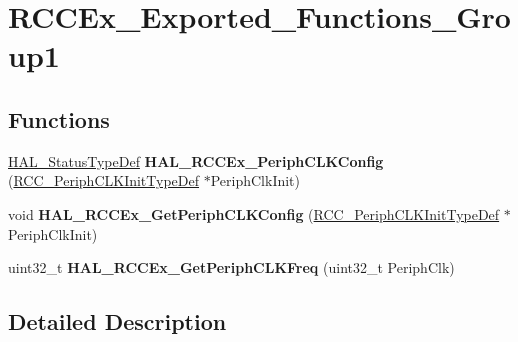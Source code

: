 \hypertarget{group___r_c_c_ex___exported___functions___group1}{}\section{R\+C\+C\+Ex\+\_\+\+Exported\+\_\+\+Functions\+\_\+\+Group1}
\label{group___r_c_c_ex___exported___functions___group1}
\subsection*{Functions}
\begin{DoxyCompactItemize}
\item 
\mbox{\label{group___r_c_c_ex___exported___functions___group1_ga0c0f61a1e2f47cc81bc43d83ba3e0d95}} 
\hyperlink{stm32f1xx__hal__def_8h_a63c0679d1cb8b8c684fbb0632743478f}{H\+A\+L\+\_\+\+Status\+Type\+Def} {\bfseries H\+A\+L\+\_\+\+R\+C\+C\+Ex\+\_\+\+Periph\+C\+L\+K\+Config} (\hyperlink{struct_r_c_c___periph_c_l_k_init_type_def}{R\+C\+C\+\_\+\+Periph\+C\+L\+K\+Init\+Type\+Def} $\ast$Periph\+Clk\+Init)
\item 
\mbox{\label{group___r_c_c_ex___exported___functions___group1_ga754fc5136c63ad52b7c459aafc8a3927}} 
void {\bfseries H\+A\+L\+\_\+\+R\+C\+C\+Ex\+\_\+\+Get\+Periph\+C\+L\+K\+Config} (\hyperlink{struct_r_c_c___periph_c_l_k_init_type_def}{R\+C\+C\+\_\+\+Periph\+C\+L\+K\+Init\+Type\+Def} $\ast$Periph\+Clk\+Init)
\item 
\mbox{\label{group___r_c_c_ex___exported___functions___group1_ga14acaeb88163a6bb0839470b753ba1bd}} 
uint32\+\_\+t {\bfseries H\+A\+L\+\_\+\+R\+C\+C\+Ex\+\_\+\+Get\+Periph\+C\+L\+K\+Freq} (uint32\+\_\+t Periph\+Clk)
\end{DoxyCompactItemize}


\subsection{Detailed Description}
